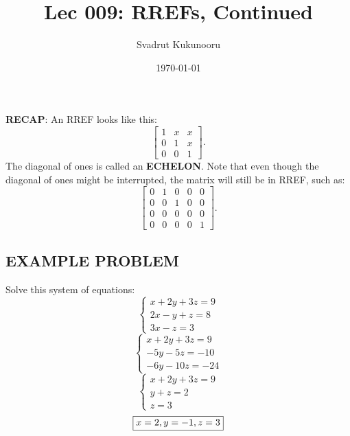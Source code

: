 \documentclass[letterpaper]{report}
\title{Lec 009: RREFs, Continued}
\author{Svadrut Kukunooru}
\date{\today}
\begin{document}
\begin{titlepage}
    \maketitle
\end{titlepage}
\textbf{RECAP}: An RREF looks like this: 
\[
\begin{bmatrix} 
    1 & x & x \\
    0 & 1 & x \\
    0 & 0 & 1
\end{bmatrix} 
.\] 
The diagonal of ones is called an \textbf{ECHELON}. 
Note that even though the diagonal of ones might be interrupted, the matrix will still be in RREF, such as: 
\[
\begin{bmatrix} 
    0 & 1 & 0 & 0 & 0 \\
    0 & 0 & 1 & 0 & 0 \\
    0 & 0 & 0 & 0 & 0 \\
    0 & 0 & 0 & 0 & 1
\end{bmatrix} 
.\] 
\subsection{EXAMPLE PROBLEM}%
\label{sub:EXAMPLE PROBLEM}
Solve this system of equations: 
\begin{equation}
    \begin{cases}
        x + 2y + 3z = 9 \\ 
        2x - y + z = 8 \\
        3x - z = 3
    \end{cases}
\end{equation}
\begin{equation}
    \begin{cases}
        x + 2y + 3z = 9 \\
        -5y -5z = -10 \\
        -6y-10z = -24
    \end{cases}
\end{equation}
\begin{equation}
    \begin{cases}
        x +  2y + 3z = 9 \\
        y + z = 2 \\
        z = 3 
    \end{cases}
\end{equation}
\[\fbox{$
        x = 2,
        y = -1,
        z = 3
$}\]
\end{document}
